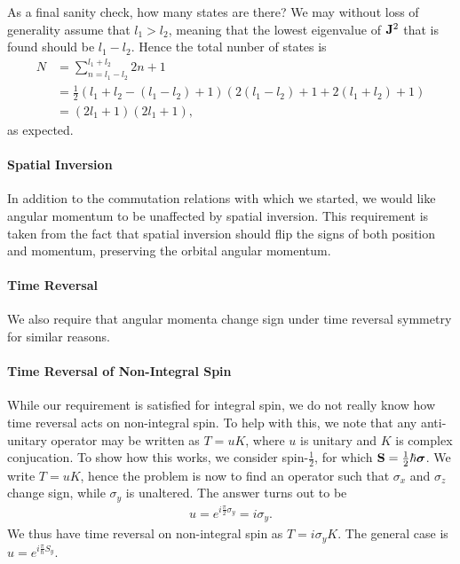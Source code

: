 As a final sanity check, how many states are there? We may without loss of generality assume that $l_{1} > l_{2}$, meaning that the lowest eigenvalue of $\vb{J}^{2}$ that is found should be $l_{1} - l_{2}$. Hence the total nunber of states is
\begin{align*}
	N &= \sum\limits_{n = l_{1} - l_{2}}^{l_{1} + l_{2}}2n + 1 \\
	  &= \frac{1}{2}(l_{1} + l_{2} - (l_{1} - l_{2}) + 1)\left(2(l_{1} - l_{2}) + 1 + 2(l_{1} + l_{2}) + 1\right) \\
	  &= (2l_{1} + 1)\left(2l_{1} + 1\right),
\end{align*}
as expected.

\paragraph{Spatial Inversion}
In addition to the commutation relations with which we started, we would like angular momentum to be unaffected by spatial inversion. This requirement is taken from the fact that spatial inversion should flip the signs of both position and momentum, preserving the orbital angular momentum.

\paragraph{Time Reversal}
We also require that angular momenta change sign under time reversal symmetry for similar reasons.

\paragraph{Time Reversal of Non-Integral Spin}
While our requirement is satisfied for integral spin, we do not really know how time reversal acts on non-integral spin. To help with this, we note that any anti-unitary operator may be written as $T = uK$, where $u$ is unitary and $K$ is complex conjucation. To show how this works, we consider spin-$\frac{1}{2}$, for which $\vb{S} = \frac{1}{2}\hbar\vb*{\sigma}$. We write $T = uK$, hence the problem is now to find an operator such that $\sigma_{x}$ and $\sigma_{z}$ change sign, while $\sigma_{y}$ is unaltered. The answer turns out to be
\begin{align*}
	u = e^{i\frac{\pi}{2}\sigma_{y}} = i\sigma_{y}.
\end{align*}
We thus have time reversal on non-integral spin as $T = i\sigma_{y}K$. The general case is $u = e^{i\frac{\pi}{\hbar}S_{y}}$.